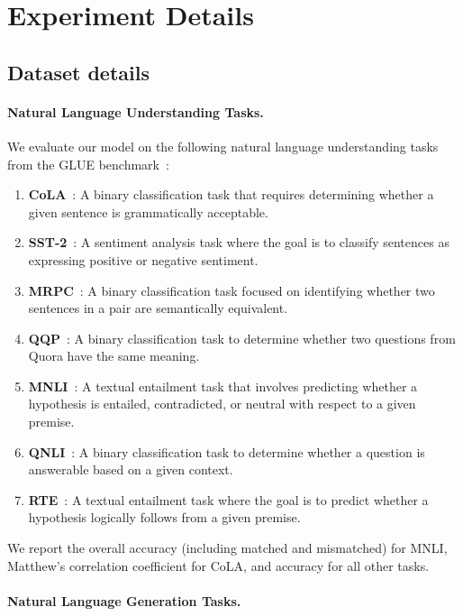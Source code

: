 \section{Experiment Details}\label{app:imple}

\subsection{Dataset details} \label{app:dataset}
\paragraph{Natural Language Understanding Tasks.}
We evaluate our model on the following natural language understanding tasks from the GLUE benchmark~\cite{wang2018glue}:  
\begin{enumerate}
\item \textbf{CoLA}~\cite{warstadt-etal-2019-neural}: A binary classification task that requires determining whether a given sentence is grammatically acceptable.  
\item \textbf{SST-2}~\cite{socher2013recursive}: A sentiment analysis task where the goal is to classify sentences as expressing positive or negative sentiment.  
\item \textbf{MRPC}~\cite{dolan2005automatically}: A binary classification task focused on identifying whether two sentences in a pair are semantically equivalent.  
\item \textbf{QQP}~\cite{wang2017bilateral}: A binary classification task to determine whether two questions from Quora have the same meaning.  
\item \textbf{MNLI}~\cite{williams2018broad}: A textual entailment task that involves predicting whether a hypothesis is entailed, contradicted, or neutral with respect to a given premise.  
\item \textbf{QNLI}~\cite{rajpurkar-etal-2016-squad}: A binary classification task to determine whether a question is answerable based on a given context.  
\item \textbf{RTE}~\cite{giampiccolo2007third}: A textual entailment task where the goal is to predict whether a hypothesis logically follows from a given premise.
\end{enumerate}
We report the overall accuracy (including matched and mismatched) for MNLI, Matthew’s correlation coefficient for CoLA, and accuracy for all other tasks.
\paragraph{Natural Language Generation Tasks.}

